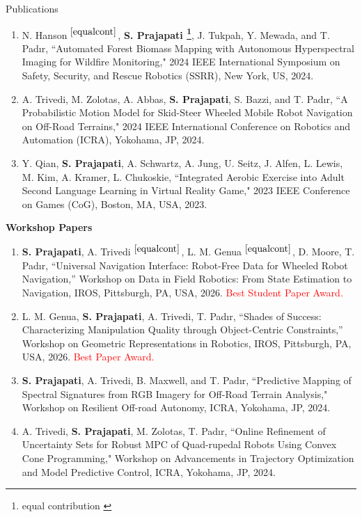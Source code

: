 \documentclass{resume}
\begin{document}
\begin{rSection}{Publications}
\begin{enumerate}[leftmargin=0.5cm]
    \item N. Hanson$^{~\ref{equalcont}}$, \textbf{S. Prajapati \footnote{equal contribution \label{equalcont}}}, J. Tukpah, Y. Mewada, and T. Pad{\i}r, ``Automated Forest Biomass Mapping with Autonomous Hyperspectral
Imaging for Wildfire Monitoring," 2024 IEEE International Symposium on Safety, Security, and Rescue Robotics (SSRR), New York, US, 2024.
    \item A. Trivedi, M. Zolotas, A. Abbas, \textbf{S. Prajapati}, S. Bazzi, and T. Pad{\i}r, ``A Probabilistic Motion Model for Skid-Steer Wheeled Mobile Robot Navigation on Off-Road Terrains," 2024 IEEE International Conference on Robotics and Automation (ICRA), Yokohama, JP, 2024.
    
    \item \vspace{-0.3em} Y. Qian, \textbf{S. Prajapati}, A. Schwartz, A. Jung, U. Seitz, J. Alfen, L. Lewis, M. Kim, A. Kramer, L. Chukoskie, ``Integrated Aerobic Exercise into Adult Second Language Learning in Virtual Reality Game," 2023 IEEE Conference on Games (CoG), Boston, MA, USA, 2023.

\end{enumerate}
\vspace{-1mm}
\textbf{Workshop Papers}
\begin{enumerate}[leftmargin=0.5cm]
\item \vspace{-0.3em} \textbf{S. Prajapati}, A. Trivedi$^{~\ref{equalcont}}$, L. M. Genua$^{~\ref{equalcont}}$, D. Moore, T. Pad{\i}r, ``Universal Navigation Interface: Robot-Free Data for Wheeled Robot Navigation,'' Workshop on Data in Field Robotics: From State Estimation to Navigation, IROS, Pittsburgh, PA, USA, 2026. \textcolor{red}{Best Student Paper Award.}

\item \vspace{-0.3em} L. M. Genua, \textbf{S. Prajapati}, A. Trivedi, T. Pad{\i}r, ``Shades of Success: Characterizing Manipulation Quality through Object-Centric Constraints,'' Workshop on Geometric Representations in Robotics, IROS, Pittsburgh, PA, USA, 2026. \textcolor{red}{Best Paper Award.}

\item \vspace{-0.3em} \textbf{S. Prajapati}, A. Trivedi, B. Maxwell, and T. Pad{\i}r, ``Predictive Mapping of Spectral Signatures from RGB Imagery for Off-Road Terrain Analysis," Workshop on Resilient Off-road Autonomy, ICRA, Yokohama, JP, 2024.
    
    \item \vspace{-0.3em} A. Trivedi, \textbf{S. Prajapati}, M. Zolotas, T. Pad{\i}r, ``Online Refinement of Uncertainty Sets for Robust MPC of Quad-rupedal
    Robots Using Convex Cone Programming," Workshop on Advancements in Trajectory Optimization and Model Predictive Control, ICRA, Yokohama, JP, 2024.
\end{enumerate}
\end{rSection}
\end{document}
